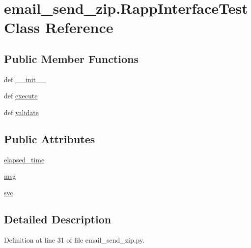 \hypertarget{classemail__send__zip_1_1RappInterfaceTest}{\section{email\-\_\-send\-\_\-zip.\-Rapp\-Interface\-Test Class Reference}
\label{classemail__send__zip_1_1RappInterfaceTest}
}
\subsection*{Public Member Functions}
\begin{DoxyCompactItemize}
\item 
def \hyperlink{classemail__send__zip_1_1RappInterfaceTest_adba1948e8d10fc95718e1e9fadbd68d8}{\-\_\-\-\_\-init\-\_\-\-\_\-}
\item 
def \hyperlink{classemail__send__zip_1_1RappInterfaceTest_a53e898acd298b78a7c7fd0bfaa5192ca}{execute}
\item 
def \hyperlink{classemail__send__zip_1_1RappInterfaceTest_ab1b1d61cb3f594a29af077ff393911d3}{validate}
\end{DoxyCompactItemize}
\subsection*{Public Attributes}
\begin{DoxyCompactItemize}
\item 
\hyperlink{classemail__send__zip_1_1RappInterfaceTest_a1b63ef6f211aa421df7fea428de553e9}{elapsed\-\_\-time}
\item 
\hyperlink{classemail__send__zip_1_1RappInterfaceTest_a70ea9e18c824335366793b19893d0a58}{msg}
\item 
\hyperlink{classemail__send__zip_1_1RappInterfaceTest_a38085ae8bee4a015a82bddeceb34a5dc}{svc}
\end{DoxyCompactItemize}


\subsection{Detailed Description}


Definition at line 31 of file email\-\_\-send\-\_\-zip.\-py.



